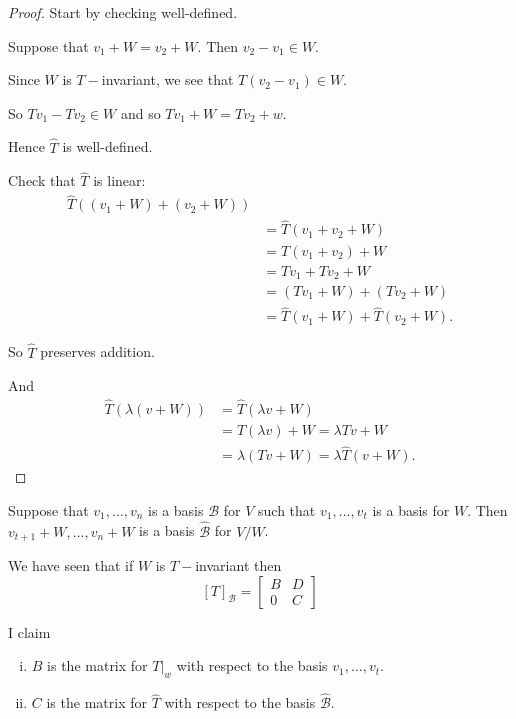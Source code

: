\documentclass{article}
\theoremstyle{definition} \newtheorem*{definition}{Definition}
\begin{document}
 \begin{proof}
   Start by checking well-defined.

   Suppose that $v_1 + W = v_2 + W$. Then $v_2 - v_1 \in W$.

   Since $W$ is $T-$invariant, we see that $T(v_2 - v_1) \in W$.

   So $Tv_1 - Tv_2 \in W$ and so $Tv_1 + W = Tv_2 + w$.

   Hence $\hat{T}$ is well-defined.

   Check that $\hat{T}$ is linear: 
   \begin{align*}
   \hat{T}\left( (v_1 + W) + (v_2 + W)  \right) \\
   &= \hat{T}(v_1 + v_2 + W) \\
   &= T(v_1 + v_2) + W \\
     &= Tv_1 + Tv_2 + W \\
     &= (Tv_1 + W) + (Tv_2 + W) \\
     &= \hat{T}(v_1 + W) + \hat{T}(v_2 + W).
   \end{align*}

   So $\hat{T}$ preserves addition.

   And 
   \begin{align*}
     \hat{T}(\lambda(v + W)) &= \hat{T}(\lambda v + W) \\
     &= T(\lambda v) + W = \lambda Tv + W \\
     &= \lambda (Tv + W) = \lambda \hat{T} (v + W).
   \end{align*}
 \end{proof}

 Suppose that $v_1, \dots, v_n$ is a basis $\mathcal{B}$ for $V$ such that 
 $v_1, \dots, v_t$ is a basis for $W$. Then
 $v_{t+1} + W, \dots , v_n + W$ is a basis $\hat{\mathcal{B}}$ for $V/W$.

 We have seen that if $W$ is $T-$invariant then 
 \[
   [T]_{\mathcal{B}} = 
      \begin{bmatrix}
        B & D \\
        0 & C
      \end{bmatrix}
 \]

 I claim 
 \begin{enumerate}[(i)]
   \item $B$ is the matrix for $T|_w$ with respect to the basis 
     $v_1, \dots, v_t$.
   \item $C$ is the matrix for $\hat{T}$ with respect to the basis
     $\hat{\mathcal{B}}$.
 \end{enumerate}
\end{document}
